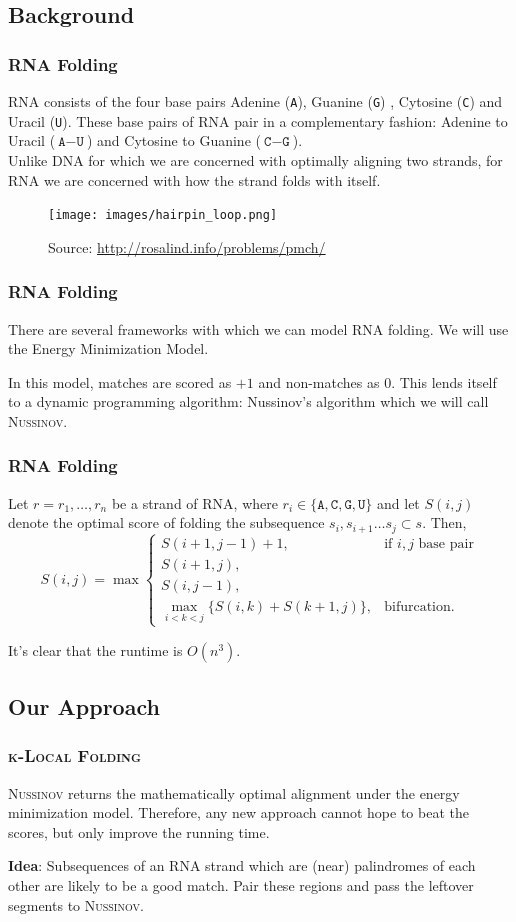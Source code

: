 \documentclass{beamer}
\title{\klf}
\subtitle{A Local Alignment Approach to RNA folding}
\author{Ben Chugg, Coulter Beeson, Kenny Drabble, Jeff Jeyachandren}
\institute{\textsc{The University of British Columbia}}
\date{April 6,2017}
\newcommand{\A}{\texttt{A}}
\newcommand{\G}{\texttt{G}}
\newcommand{\U}{\texttt{U}}
\newcommand{\C}{\texttt{C}}
\newcommand{\klf}{\textsc{k-Local Folding}\xspace}
\newcommand{\rf}{\textsc{Nussinov}\xspace}
\newcommand{\s}{\vspace{1cm}}
\begin{document}
\begin{frame}
\titlepage
\end{frame}


\begin{frame}
\section*{Background}
\frametitle{RNA Folding}
RNA consists of the four base pairs Adenine (\A), Guanine (\G) , Cytosine (\C) and Uracil (\U). These base pairs of RNA pair in a complementary fashion: Adenine to Uracil ($\A-\U$) and Cytosine to Guanine ($\C-\G$). \\

Unlike DNA for which we are concerned with optimally aligning two strands, for RNA we are concerned with how the strand folds with itself. 

\begin{figure}
\centering
\texttt{[image: images/hairpin\_loop.png]}
\vspace{-0.2cm}
\caption{Source: \url{http://rosalind.info/problems/pmch/}}
\end{figure}
\end{frame}

\begin{frame}
\frametitle{RNA Folding}
There are several frameworks with which we can model RNA folding. We will use the Energy Minimization Model. \s

In this model, matches are scored as $+1$ and non-matches as 0. This lends itself to a dynamic programming algorithm: Nussinov's algorithm which we will call \rf. 
\end{frame}

\begin{frame}
\frametitle{RNA Folding}
Let $r=r_1,\ldots,r_n$ be a strand of RNA, where $r_i\in\{\A,\C,\G,\U\}$ and let $S(i,j)$ denote the optimal score of folding the subsequence $s_i,s_{i+1}\ldots s_j\subset s$. Then, 
\[S(i,j)=\max\begin{cases}
S(i+1,j-1)+1,&\text{if }i,j\text{ base pair}\\
S(i+1,j),\\
S(i,j-1),\\
\displaystyle \max_{i<k<j}\{S(i,k)+S(k+1,j)\},&\text{bifurcation}.
\end{cases}\]

It's clear that the runtime is $O(n^3)$. 
\end{frame}


\begin{frame}
\section{Our Approach}
\frametitle{\klf}
\rf returns the mathematically optimal alignment under the energy minimization model. Therefore, any new approach cannot hope to beat the scores, but only improve the running time. \s

\textbf{Idea}: Subsequences of an RNA strand which are (near) palindromes of each other are likely to be a good match. Pair these regions and pass the leftover segments to \rf. 
\end{frame}
\end{document}
